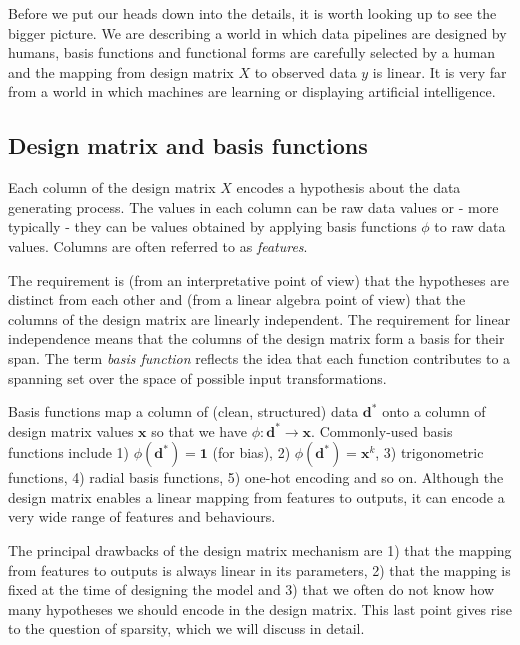 \documentclass[11pt]{article}
\begin{document}
	Before we put our heads down into the details, it is worth looking up to see the bigger picture. We are describing a world in which data pipelines are designed by humans, basis functions and functional forms are carefully selected by a human and the mapping from design matrix $X$ to observed data $y$ is linear. It is very far from a world in which machines are learning or displaying artificial intelligence.
	
	\subsection{Design matrix and basis functions}
	
	Each column of the design matrix $X$ encodes a hypothesis about the data generating process. The values in each column can be raw data values or - more typically - they can be values obtained by applying basis functions $\phi$ to raw data values. Columns are often referred to as \emph{features}.
	
	The requirement is (from an interpretative point of view) that the hypotheses are distinct from each other and (from a linear algebra point of view) that the columns of the design matrix are linearly independent. The requirement for linear independence means that the columns of the design matrix form a basis for their span. The term \emph{basis function} reflects the idea that each function contributes to a spanning set over the space of possible input transformations.
	
	Basis functions map a column of (clean, structured) data $\boldsymbol{d}^{*}$ onto a column of design matrix values $\boldsymbol{x}$ so that we have $\phi:\boldsymbol{d}^{*} \rightarrow \boldsymbol{x}$. Commonly-used basis functions include 1) $\phi(\boldsymbol{d}^{*}) = \boldsymbol{1}$ (for bias), 2) $\phi(\boldsymbol{d}^{*}) = \boldsymbol{x} ^ {k}$, 3) trigonometric functions, 4) radial basis functions, 5) one-hot encoding and so on. Although the design matrix enables a linear mapping from features to outputs, it can encode a very wide range of features and behaviours.
	
	The principal drawbacks of the design matrix mechanism are 1) that the mapping from features to outputs is always linear in its parameters, 2) that the mapping is fixed at the time of designing the model and 3) that we often do not know how many hypotheses we should encode in the design matrix. This last point gives rise to the question of sparsity, which we will discuss in detail.
	
\end{document}
